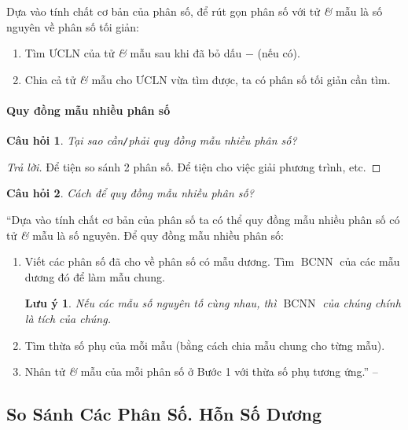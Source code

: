 \documentclass{article}
\numberwithin{equation}{section}
\newtheorem{cauhoi}{Câu hỏi}[section]
\newtheorem{luuy}{Lưu ý}[section]
\begin{document}
Dựa vào tính chất cơ bản của phân số, để rút gọn phân số với tử \textit{\&} mẫu là số nguyên về phân số tối giản:
\begin{enumerate}
	\item Tìm $\mbox{ƯCLN}$ của tử \textit{\&} mẫu sau khi đã bỏ dấu $-$ (nếu có).
	\item Chia cả tử \textit{\&} mẫu cho $\mbox{ƯCLN}$ vừa tìm được, ta có phân số  tối giản cần tìm.
\end{enumerate}

\paragraph{Quy đồng mẫu nhiều phân số}
\begin{cauhoi}
	Tại sao cần\emph{\texttt{/}}phải quy đồng mẫu nhiều phân số?
\end{cauhoi}

\begin{proof}[Trả lời]
	Để tiện so sánh 2 phân số. Để tiện cho việc giải phương trình, etc.
\end{proof}

\begin{cauhoi}
	Cách để quy đồng mẫu nhiều phân số?
\end{cauhoi}
``Dựa vào tính chất cơ bản của phân số ta có thể quy đồng mẫu nhiều phân số có tử \textit{\&} mẫu là số nguyên. Để quy đồng mẫu nhiều phân số:
\begin{enumerate}
	\item Viết các phân số đã cho về phân số có mẫu dương. Tìm $\operatorname{BCNN}$ của các mẫu dương đó để làm mẫu chung.
	\begin{luuy}
		Nếu các mẫu số nguyên tố cùng nhau, thì $\operatorname{BCNN}$ của chúng chính là tích của chúng.
	\end{luuy}
	\item Tìm thừa số phụ của mỗi mẫu (bằng cách chia mẫu chung cho từng mẫu).
	\item Nhân tử \textit{\&} mẫu của mỗi phân số ở Bước 1 với thừa số phụ tương ứng.'' -- \cite[p. 29]{SGK_Toan_6_Canh_Dieu_tap_2}
\end{enumerate}


\subsection{So Sánh Các Phân Số. Hỗn Số Dương}
\end{document}
